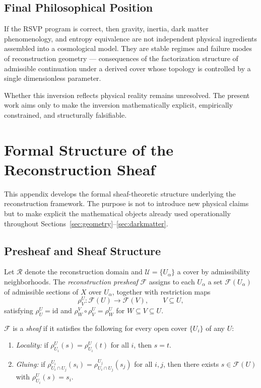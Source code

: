 \documentclass[11pt, a4paper]{article}
\theoremstyle{plain}
\theoremstyle{definition}
\theoremstyle{remark}
\newcommand{\sheaf}{\mathcal{F}}
\newcommand{\cover}{\{U_\alpha\}}
\newcommand{\recon}{\mathcal{R}}
\newcommand{\Ucover}{\mathcal{U}}
\begin{document}
\subsection{Final Philosophical Position}

If the RSVP program is correct, then gravity, inertia, dark matter phenomenology,
and entropy equivalence are not independent physical ingredients assembled into a
cosmological model. They are stable regimes and failure modes of reconstruction
geometry --- consequences of the factorization structure of admissible continuation
under a derived cover whose topology is controlled by a single dimensionless
parameter.

Whether this inversion reflects physical reality remains unresolved. The present work
aims only to make the inversion mathematically explicit, empirically constrained, and
structurally falsifiable.

\appendix

\section{Formal Structure of the Reconstruction Sheaf}
\label{app:sheaf}

This appendix develops the formal sheaf-theoretic structure underlying the
reconstruction framework. The purpose is not to introduce new physical claims but to
make explicit the mathematical objects already used operationally throughout
Sections~\ref{sec:geometry}--\ref{sec:darkmatter}.

\subsection{Presheaf and Sheaf Structure}

Let $\recon$ denote the reconstruction domain and $\Ucover = \cover$ a cover by
admissibility neighborhoods. The \emph{reconstruction presheaf} $\sheaf$ assigns to
each $U_\alpha$ a set $\sheaf(U_\alpha)$ of admissible sections of $X$ over
$U_\alpha$, together with restriction maps
\[
  \rho_{V}^{U} \colon \sheaf(U) \longrightarrow \sheaf(V), \qquad V \subseteq U,
\]
satisfying $\rho_{U}^{U} = \mathrm{id}$ and $\rho_{W}^{V} \circ \rho_{V}^{U} =
\rho_{W}^{U}$ for $W \subseteq V \subseteq U$.

$\sheaf$ is a \emph{sheaf} if it satisfies the following for every open cover
$\{U_i\}$ of any $U$:
\begin{enumerate}[label=(\roman*)]
  \item \textit{Locality:} if $\rho_{U_i}^{U}(s) = \rho_{U_i}^{U}(t)$ for all $i$,
    then $s = t$.
  \item \textit{Gluing:} if $\rho_{U_i \cap U_j}^{U_i}(s_i) =
    \rho_{U_i \cap U_j}^{U_j}(s_j)$ for all $i, j$, then there exists $s \in
    \sheaf(U)$ with $\rho_{U_i}^{U}(s) = s_i$.
\end{enumerate}
\end{document}
